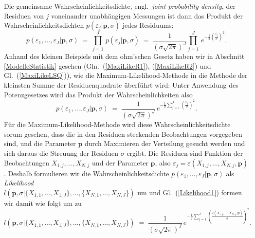 Die gemeinsame Wahrscheinlichkeitsdichte, engl.\ \textsl{joint probability density}, der
Residuen von $j$ voneinander unabhängigen Messungen ist dann das Produkt der
Wahrscheinlichkeitsdichten $p(\varepsilon_j | \mathbf{p}, \sigma)$
jedes Residuums:
\begin{equation}
p(\varepsilon_1,\dots,\varepsilon_J | \mathbf{p}, \sigma) \; = \; 
\prod\limits_{j = 1}^J \, p(\varepsilon_j | \mathbf{p}, \sigma) \; = \; 
 \frac{1}{(\sigma \sqrt{2 \pi})^J} \prod\limits_{j = 1}^J \, 
e^{-\frac{1}{2} \left(\frac{\varepsilon_j}{\sigma}\right)^2}.
\end{equation}
Anhand des kleinen Beispiels mit dem ohm'schen Gesetz haben wir in Abschnitt \ref{ModelleStatistik}
gesehen (Gln.~(\ref{MaxiLikeR1}), (\ref{MaxiLikeR2}) und Gl.~(\ref{MaxiLikeLSQ})),
wie die Maximum-Likelihood-Methode in die Methode der kleinsten Summe der
Residuenquadrate überführt wird:
Unter Anwendung des Potenzgesetzes wird das Produkt der Wahrscheinlichkeiten also
\begin{equation}
p(\varepsilon_1,\dots,\varepsilon_J | \mathbf{p}, \sigma) \; = \; 
 \frac{1}{(\sigma \sqrt{2 \pi})^J}  \, 
e^{-\frac{1}{2} \sum\limits_{j = 1}^J \left(\frac{\varepsilon_j}{\sigma}\right)^2} .
\label{Likelihood1}
\end{equation}
Für die Maximum-Likelihood-Methode wird diese Wahrscheinlichkeitsdichte sorum gesehen,
dass die in den Residuen steckenden Beobachtungen vorgegeben sind, und die 
Parameter $\mathbf{p}$ durch Maximieren der Verteilung gesucht werden und sich daraus
die Streuung der Residuen $\sigma$ ergibt. Die Residuen sind Funktion der
Beobachtungen $X_{1,j},\dots,X_{N,j}$ und der Parameter $\mathbf{p}$, also
$\varepsilon_j = \varepsilon(X_{1,j},\dots,X_{N,j}, \mathbf{p})$. 
Deshalb formulieren wir die Wahrscheinlichkeitsdichte
$p(\varepsilon_1,\dots,\varepsilon_J | \mathbf{p}, \sigma)$ 
als \textsl{Likelihood} \\
$l(\mathbf{p}, \sigma | \{X_{1,1}, \dots, X_{1,J}\}, \dots, \{X_{N,1}, \dots, X_{N,J}\})$
um und Gl.~(\ref{Likelihood1}) formen wir damit wie folgt um zu
\begin{equation}
l(\mathbf{p}, \sigma | \{X_{1,1}, \dots, X_{1,J}\}, \dots, \{X_{N,1}, \dots, X_{N,J}\}) \; = \; 
 \frac{1}{(\sigma \sqrt{2 \pi})^J}  \, 
e^{-\frac{1}{2} \sum\limits_{j = 1}^J \left(\frac{\varepsilon(X_{1,j},\dots,X_{N,j}, \mathbf{p})}{\sigma}\right)^2} .
\label{Likelihood2}
\end{equation}

